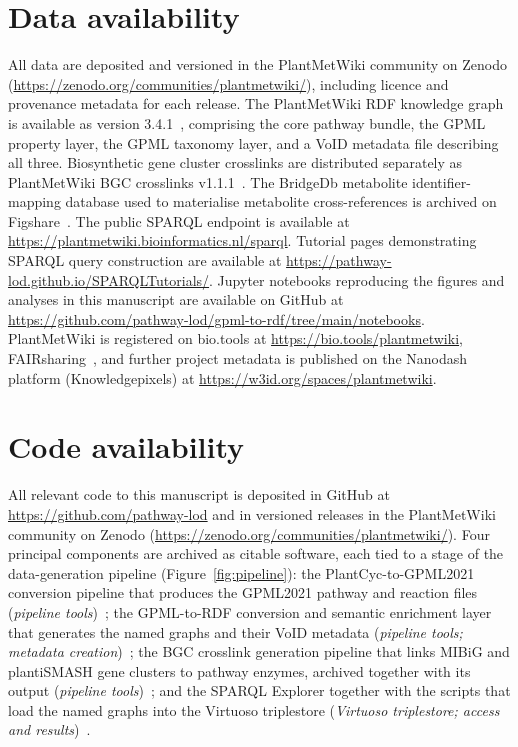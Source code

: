\documentclass[11pt,a4paper]{article}
\begin{document}
\section*{Data availability}

All data are deposited and versioned in the PlantMetWiki community on Zenodo
(\url{https://zenodo.org/communities/plantmetwiki/}), including licence and provenance metadata for
each release. The PlantMetWiki RDF knowledge graph is available as version 3.4.1~\cite{delpup2026rdf},
comprising the core pathway bundle, the GPML property layer, the GPML taxonomy layer, and a VoID
metadata file describing all three. Biosynthetic gene cluster crosslinks are distributed separately as
PlantMetWiki BGC crosslinks v1.1.1~\cite{delpup2026bgc}. The BridgeDb metabolite
identifier-mapping database used to materialise metabolite cross-references is archived on
Figshare~\cite{bridgedb2026db}. The public SPARQL endpoint is available at
\url{https://plantmetwiki.bioinformatics.nl/sparql}. Tutorial pages demonstrating SPARQL query
construction are available at \url{https://pathway-lod.github.io/SPARQLTutorials/}. Jupyter notebooks
reproducing the figures and analyses in this manuscript are available on GitHub at
\url{https://github.com/pathway-lod/gpml-to-rdf/tree/main/notebooks}. PlantMetWiki is registered on
bio.tools at \url{https://bio.tools/plantmetwiki}, FAIRsharing~\cite{plantmetwiki2026fairsharing}, and further project metadata is published on the
Nanodash platform (Knowledgepixels) at \url{https://w3id.org/spaces/plantmetwiki}.

\section*{Code availability}

All relevant code to this manuscript is deposited in GitHub at \url{https://github.com/pathway-lod}
and in versioned releases in the PlantMetWiki community on Zenodo
(\url{https://zenodo.org/communities/plantmetwiki/}). Four principal components are archived as
citable software, each tied to a stage of the data-generation pipeline (Figure~\ref{fig:pipeline}): the
PlantCyc-to-GPML2021 conversion pipeline that produces the GPML2021 pathway and reaction files
(\emph{pipeline tools})~\cite{delpup2026cyc2wiki}; the GPML-to-RDF conversion and semantic enrichment
layer that generates the named graphs and their VoID metadata (\emph{pipeline tools; metadata
creation})~\cite{delpup2026gpml2rdf}; the BGC crosslink generation pipeline that links MIBiG and
plantiSMASH gene clusters to pathway enzymes, archived together with its output
(\emph{pipeline tools})~\cite{delpup2026bgc}; and the SPARQL Explorer together with the scripts
that load the named graphs into the Virtuoso triplestore (\emph{Virtuoso triplestore; access and
results})~\cite{delpup2026snorql}.
\end{document}
